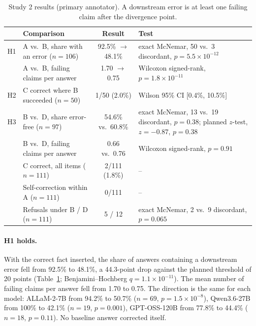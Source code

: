 \documentclass[10pt]{article}
\begin{document}
\begin{table}[t]
\caption{Study 2 results (primary annotator). A downstream error is at least one failing claim after the divergence point.}
\label{tab:s2}
\begin{center}
\small
\begin{tabular}{@{}lp{4.4cm}cp{4.6cm}@{}}
\toprule
 & Comparison & Result & Test \\
\midrule
H1 & A vs.\ B, share with an error ($n=106$) & 92.5\% $\to$ 48.1\% & exact McNemar, 50 vs.\ 3 discordant, $p=5.5\times10^{-12}$ \\
 & A vs.\ B, failing claims per answer & 1.70 $\to$ 0.75 & Wilcoxon signed-rank, $p=1.8\times10^{-11}$ \\
H2 & C correct where B succeeded ($n=50$) & 1/50 (2.0\%) & Wilson 95\% CI [0.4\%, 10.5\%] \\
H3 & B vs.\ D, share error-free ($n=97$) & 54.6\% vs.\ 60.8\% & exact McNemar, 13 vs.\ 19 discordant, $p=0.38$; planned $z$-test, $z=-0.87$, $p=0.38$ \\
 & B vs.\ D, failing claims per answer & 0.66 vs.\ 0.76 & Wilcoxon signed-rank, $p=0.91$ \\
\midrule
 & C correct, all items ($n=111$) & 2/111 (1.8\%) & -- \\
 & Self-correction within A ($n=111$) & 0/111 & -- \\
 & Refusals under B / D ($n=111$) & 5 / 12 & exact McNemar, 2 vs.\ 9 discordant, $p=0.065$ \\
\bottomrule
\end{tabular}
\end{center}
\end{table}

\paragraph{H1 holds.} With the correct fact inserted, the share of answers containing a downstream error fell from 92.5\% to 48.1\%, a 44.3-point drop against the planned threshold of 20 points (Table~\ref{tab:s2}; Benjamini--Hochberg $q=1.1\times10^{-11}$). The mean number of failing claims per answer fell from 1.70 to 0.75. The direction is the same for each model: ALLaM-2-7B from 94.2\% to 50.7\% ($n=69$, $p=1.5\times10^{-8}$), Qwen3.6-27B from 100\% to 42.1\% ($n=19$, $p=0.001$), GPT-OSS-120B from 77.8\% to 44.4\% ($n=18$, $p=0.11$). No baseline answer corrected itself.
\end{document}
